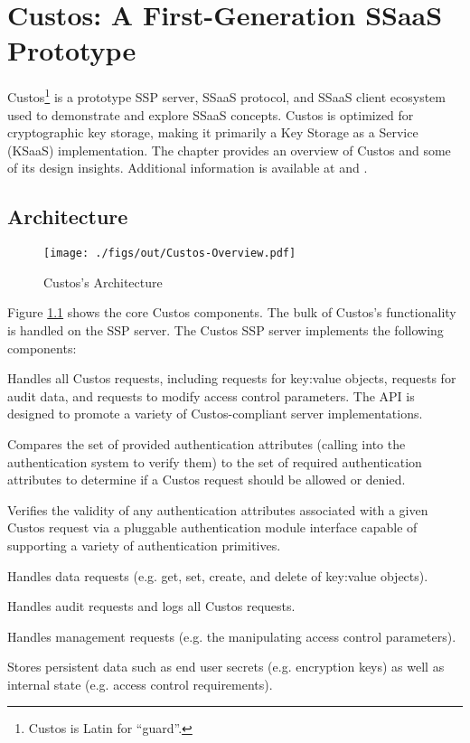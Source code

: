 \chapter{Custos: A First-Generation SSaaS Prototype}
\label{chap:custos}

Custos\footnote{Custos is Latin for ``guard''.} is a prototype SSP
server, SSaaS protocol, and SSaaS client ecosystem used to demonstrate
and explore SSaaS concepts. Custos is optimized for cryptographic key
storage, making it primarily a Key Storage as a Service (KSaaS)
implementation. The chapter provides an overview of Custos and some of
its design insights. Additional information is available at
\cite{custos-masters} and \cite{custos-trios}.

\section{Architecture}
\label{chap:custos:arch}

\begin{figure}[t]
  \centering
  \texttt{[image: ./figs/out/Custos-Overview.pdf]}
  \caption{Custos's Architecture}
  \label{fig:custos-overview}
\end{figure}

Figure \ref{fig:custos-overview} shows the core Custos components. The
bulk of Custos's functionality is handled on the SSP server. The
Custos SSP server implements the following components:

\begin{packed_desc}
\item[API:] Handles all Custos requests, including requests for
  key:value objects, requests for audit data, and requests to modify
  access control parameters. The API is designed to promote a variety
  of Custos-compliant server implementations.
\item[Access Control:] Compares the set of provided authentication
  attributes (calling into the authentication system to verify them)
  to the set of required authentication attributes to determine if a
  Custos request should be allowed or denied.
\item[Authentication:] Verifies the validity of any authentication
  attributes associated with a given Custos request via a pluggable
  authentication module interface capable of supporting a variety of
  authentication primitives.
\item[Data:] Handles data requests (e.g. get, set, create, and
  delete of key:value objects).
\item[Auditing:] Handles audit requests and logs all Custos
  requests.
\item[Management:] Handles management requests (e.g. the
  manipulating access control parameters).
\item[Key-Value Secret Store:] Stores persistent data such as end user
  secrets (e.g. encryption keys) as well as internal state
  (e.g. access control requirements).
\end{packed_desc}

